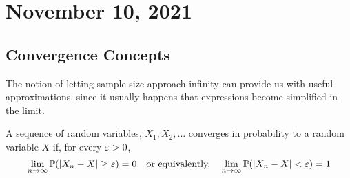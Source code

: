 \section{November 10, 2021}
\subsection{Convergence Concepts}
The notion of letting sample size approach infinity can provide us with useful approximations, since it usually happens that expressions become simplified in the limit. 
\\
\begin{definition}
    A sequence of random variables, $X_1,X_2,...$ converges in probability to a random variable $X$ if, for every $\varepsilon > 0$,
    $$
    \lim_{n \to \infty}\mathbb P(|X_n -X| \geq \varepsilon) = 0  \quad \text{or equivalently,} \quad  \lim_{n \to \infty}\mathbb P(|X_n -X| < \varepsilon) = 1
    $$
\end{definition}